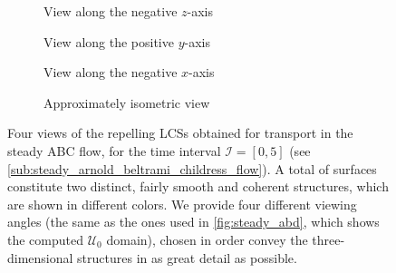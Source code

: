 \begin{figure}[htpb]
    \centering
    \hspace*{\fill}
    \begin{subfigure}[b]{0.42\textwidth}
        \centering
        \caption[]{{\small View along the negative $z$-axis}}
        \label{fig:steady_lcss_z}
    \end{subfigure}\hfill%
    \begin{subfigure}[b]{0.42\textwidth}
        \centering
        \caption[]{{\small View along the positive $y$-axis}}
        \label{fig:steady_lcss_y}
    \end{subfigure}%
    \hspace*{\fill}

    \hspace*{\fill}
    \begin{subfigure}[b]{0.42\textwidth}
        \centering
        \caption[]{{\small View along the negative $x$-axis}}
        \label{fig:steady_lcss_x}
    \end{subfigure}\hfill%
    \begin{subfigure}[b]{0.42\textwidth}
        \centering
        \caption[]{{\small Approximately isometric view}}
        \label{fig:steady_lcss_isometric}
    \end{subfigure}%
    \hspace*{\fill}
    \caption[Four views of the repelling LCSs obtained for transport in the
    steady ABC flow]
    {
        Four views of the repelling LCSs obtained for transport in the steady
        ABC flow, for the time interval $\mathcal{I}=[0,5]$ (see
        \cref{sub:steady_arnold_beltrami_childress_flow}). A total of
         surfaces constitute two distinct, fairly smooth and
        coherent structures, which are shown in different colors. We provide
        four different viewing angles (the same as the ones used in
        \cref{fig:steady_abd}, which shows the computed $\mathcal{U}_{0}$
        domain), chosen in order convey the three-dimensional structures in as
        great detail as possible.
}
    \label{fig:steady_lcss}
\end{figure}

